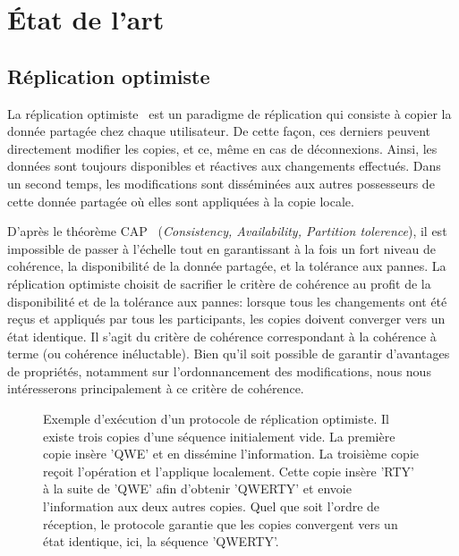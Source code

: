 
\section{État de l'art}

\subsection{Réplication optimiste}

La réplication optimiste~\cite{demers1987epidemic, saito2005optimistic} est un
paradigme de réplication qui consiste à copier la donnée partagée chez chaque
utilisateur. De cette façon, ces derniers peuvent directement modifier les
copies, et ce, même en cas de déconnexions.  Ainsi, les données sont toujours
disponibles et réactives aux changements effectués. Dans un second temps, les
modifications sont disséminées aux autres possesseurs de cette donnée partagée
où elles sont appliquées à la copie locale.

D'après le théorème CAP~\cite{gilbert2002brewer} (\emph{Consistency,
  Availability, Partition tolerence}), il est impossible de passer à l'échelle
tout en garantissant à la fois un fort niveau de cohérence, la disponibilité de
la donnée partagée, et la tolérance aux pannes. La réplication optimiste choisit
de sacrifier le critère de cohérence au profit de la disponibilité et de la
tolérance aux pannes: lorsque tous les changements ont été reçus et appliqués par
tous les participants, les copies doivent converger vers un état identique. Il
s'agit du critère de cohérence correspondant à la cohérence à terme (ou
cohérence inéluctable). Bien qu'il soit possible de garantir d'avantages de
propriétés, notamment sur l'ordonnancement des modifications, nous nous
intéresserons principalement à ce critère de cohérence.

\begin{figure}
  \centering
  
  \caption{\label{fig:lseq:optimisticexample}Exemple d'exécution d'un protocole
    de réplication optimiste. Il existe trois copies d'une séquence initialement
    vide. La première copie insère 'QWE' et en dissémine l'information. La
    troisième copie reçoit l'opération et l'applique localement. Cette copie
    insère 'RTY' à la suite de 'QWE' afin d'obtenir 'QWERTY' et envoie
    l'information aux deux autres copies. Quel que soit l'ordre de réception, le
    protocole garantie que les copies convergent vers un état identique, ici, la
    séquence 'QWERTY'.}
\end{figure}

